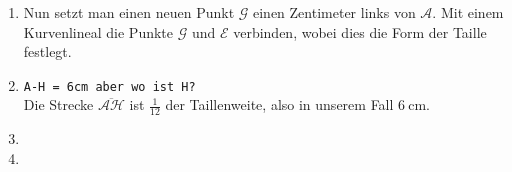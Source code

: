 \documentclass{scrartcl}
\begin{document}
\begin{enumerate}
  \item Nun setzt man einen neuen Punkt $\mathcal{G}$ einen Zentimeter links
      von $\mathcal{A}$. Mit einem Kurvenlineal die Punkte
      $\mathcal{G}\text{ und }\mathcal{E}$ verbinden, wobei dies die Form der
      Taille festlegt.

    \item \Emailct \texttt{A-H = 6cm aber wo ist H?} \\ Die Strecke
      $\overline{\mathcal{AH}}$ ist $\frac{1}{12}$ der Taillenweite, also in
      unserem Fall $\SI{6}{\centi\meter}$. 
  \item
  \item
\end{enumerate}
\end{document}
